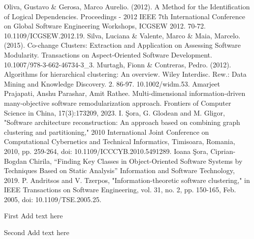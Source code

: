\documentclass{ieeeaccess}
\begin{document}
\begin{thebibliography}{00}
 Oliva, Gustavo \& Gerosa, Marco Aurelio. (2012). A Method for the Identification of Logical Dependencies. Proceedings - 2012 IEEE 7th International Conference on Global Software Engineering Workshops, ICGSEW 2012. 70-72. 10.1109/ICGSEW.2012.19. 
 Silva, Luciana \& Valente, Marco \& Maia, Marcelo. (2015). Co-change Clusters: Extraction and Application on Assessing Software Modularity. Transactions on Aspect-Oriented Software Development. 10.1007/978-3-662-46734-3\_3. 
 Murtagh, Fionn \& Contreras, Pedro. (2012). Algorithms for hierarchical clustering: An overview. Wiley Interdisc. Rew.: Data Mining and Knowledge Discovery. 2. 86-97. 10.1002/widm.53. 
 Amarjeet Prajapati, Anshu Parashar, Amit Rathee. Multi-dimensional information-driven many-objective software remodularization approach. Frontiers of Computer Science in China, 17(3):173209, 2023.
 I. Şora, G. Glodean and M. Gligor, "Software architecture reconstruction: An approach based on combining graph clustering and partitioning," 2010 International Joint Conference on Computational Cybernetics and Technical Informatics, Timisoara, Romania, 2010, pp. 259-264, doi: 10.1109/ICCCYB.2010.5491289.
 Ioana Şora, Ciprian-Bogdan Chirila, “Finding Key Classes in Object-Oriented Software Systems by Techniques Based on Static Analysis”  Information and Software Technology, 2019.
 P. Andritsos and V. Tzerpos, "Information-theoretic software clustering," in IEEE Transactions on Software Engineering, vol. 31, no. 2, pp. 150-165, Feb. 2005, doi: 10.1109/TSE.2005.25. 
\end{thebibliography}

\begin{IEEEbiographynophoto}{First} Add text here
\end{IEEEbiographynophoto}

\begin{IEEEbiographynophoto}{Second} Add text here
\end{IEEEbiographynophoto}

\EOD
\end{document}
